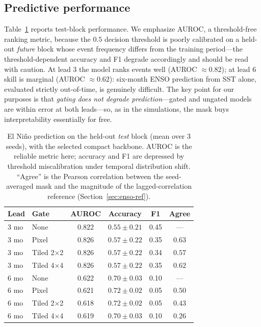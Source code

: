 \documentclass[12pt]{article}
\begin{document}
\subsection{Predictive performance}
Table~\ref{tab:enso} reports test-block performance. We emphasize AUROC, a threshold-free ranking
metric, because the $0.5$ decision threshold is poorly calibrated on a held-out \emph{future}
block whose event frequency differs from the training period---the threshold-dependent accuracy
and F1 degrade accordingly and should be read with caution. At lead 3 the model ranks events well
(AUROC $\approx 0.82$); at lead 6 skill is marginal (AUROC $\approx 0.62$): six-month ENSO
prediction from SST alone, evaluated strictly out-of-time, is genuinely difficult. The key point
for our purposes is that \emph{gating does not degrade prediction}---gated and ungated models are
within error at both leads---so, as in the simulations, the mask buys interpretability essentially
for free.

\begin{table}[htbp]
\centering
\caption{El Ni\~no prediction on the held-out \emph{test} block (mean over 3 seeds), with the
  selected compact backbone. AUROC is the reliable metric here; accuracy and F1 are depressed by
  threshold miscalibration under temporal distribution shift. ``Agree'' is the Pearson correlation
  between the seed-averaged mask and the magnitude of the lagged-correlation reference
  (Section~\ref{sec:enso-ref}).}
\label{tab:enso}
\begin{tabular}{llcccc}
\toprule
\textbf{Lead} & \textbf{Gate} & \textbf{AUROC} & \textbf{Accuracy} & \textbf{F1} & \textbf{Agree} \\
\midrule
3 mo & None            & 0.822 & $0.55\pm0.21$ & 0.45 & --- \\
3 mo & Pixel           & 0.826 & $0.57\pm0.22$ & 0.35 & $\mathbf{0.63}$ \\
3 mo & Tiled 2$\times$2 & 0.826 & $0.57\pm0.22$ & 0.34 & $0.57$ \\
3 mo & Tiled 4$\times$4 & 0.826 & $0.57\pm0.22$ & 0.35 & $0.62$ \\
\midrule
6 mo & None            & 0.622 & $0.70\pm0.03$ & 0.10 & --- \\
6 mo & Pixel           & 0.621 & $0.72\pm0.02$ & 0.05 & $0.50$ \\
6 mo & Tiled 2$\times$2 & 0.618 & $0.72\pm0.02$ & 0.05 & $0.43$ \\
6 mo & Tiled 4$\times$4 & 0.619 & $0.70\pm0.03$ & 0.10 & $0.26$ \\
\bottomrule
\end{tabular}
\end{table}
\end{document}
